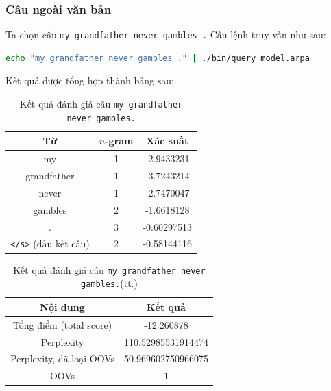 \documentclass[12pt]{article}
\begin{document}
\subsubsection{Câu ngoài văn bản}
Ta chọn câu \texttt{my grandfather never gambles .} Câu lệnh truy vấn như sau:
\begin{lstlisting}[language=sh]
echo "my grandfather never gambles ." | ./bin/query model.arpa
\end{lstlisting}
\begin{figure}[H]
\end{figure}
\noindent Kết quả được tổng hợp thành bảng sau:
\begin{table}[H]
\centering
\begin{tabular}{|c|c|c|}
    \hline
    Từ & $n$-gram & Xác suất \\
    \hline
    my & 1 & -2.9433231\\
    grandfather & 1 & -3.7243214\\
    never & 1 & -2.7470047\\
    gambles & 2 & -1.6618128\\
    . & 3 & -0.60297513\\
    \texttt{</s>} (dấu kết câu) & 2 & -0.58144116\\
    \hline
\end{tabular}
\caption{Kết quả đánh giá câu \texttt{my grandfather never gambles.}}
\label{table:4}
\end{table}
\begin{table}[h!]
\centering
\begin{tabular}{|c|c|}
    \hline
    Nội dung & Kết quả \\
    \hline
    Tổng điểm (total score) & -12.260878 \\
    Perplexity & 110.52985531914474\\
    Perplexity, đã loại OOVs & 50.969602750966075\\
    OOVs & 1 \\
    \hline
\end{tabular}
\caption{Kết quả đánh giá câu \texttt{my grandfather never gambles.}(tt.)}
\end{table}
\end{document}
